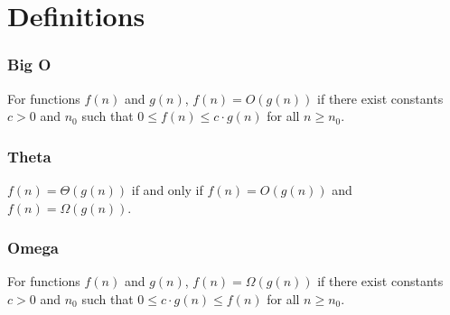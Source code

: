 \documentclass[12pt]{article}
\begin{document}
\section*{Definitions}

\subsubsection*{Big O}
For functions \( f(n) \) and \( g(n) \), \( f(n) = O(g(n)) \) if there exist constants \( c > 0 \) and \( n_0 \) such that \( 0 \leq f(n) \leq c \cdot g(n) \) for all \( n \geq n_0 \).

\subsubsection*{Theta}
\( f(n) = \Theta(g(n)) \) if and only if \( f(n) = O(g(n)) \) and \( f(n) = \Omega(g(n)) \).

\subsubsection*{Omega}
For functions \( f(n) \) and \( g(n) \), \( f(n) = \Omega(g(n)) \) if there exist constants \( c > 0 \) and \( n_0 \) such that \( 0 \leq c \cdot g(n) \leq f(n) \) for all \( n \geq n_0 \).
\end{document}
